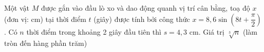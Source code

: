 \begin{ex}
	Một vật $M$ được gắn vào đầu lò xo và dao động quanh vị trí cân bằng, toạ độ $x$ (đơn vị: cm) tại thời điểm $t$ (giây) được tính bởi công thức $x=8{,}6\sin \left(8t+\dfrac{\pi }{2}\right)$. Có $n$ thời điểm trong khoảng 2 giây đầu tiên thì $s=4{,}3$ cm. Giá trị $\sqrt[3]{n}$ (làm tròn đến hàng phần trăm)
\end{ex}
